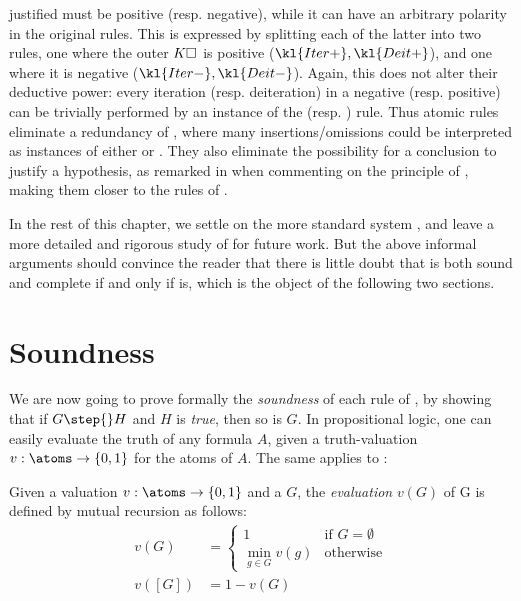 \begin{scope}
\begin{description}
  justified  must be positive (resp. negative), while it can have an
  arbitrary polarity in the original rules. This is expressed by splitting each
  of the latter into two rules, one where the outer  $K\square$ is positive
  ($\kl{Iter{+}},\kl{Deit{+}}$), and one where it is negative
  ($\kl{Iter{-}},\kl{Deit{-}}$). Again, this does not alter their deductive
  power: every iteration (resp. deiteration) in a negative (resp. positive)
   can be trivially performed by an instance of the  (resp.
  ) rule. Thus atomic rules eliminate a redundancy of ,
  where many insertions/omissions could be interpreted as instances of either
   or . They also eliminate the possibility for a
  conclusion to justify a hypothesis, as remarked in  when
  commenting on the principle of , making them closer to the
  rules of .
\end{description}

In the rest of this chapter, we settle on the more standard system ,
and leave a more detailed and rigorous study of  for future work.
But the above informal arguments should convince the reader that there is little
doubt that  is both sound and complete if and only if 
is, which is the object of the following two sections.

\section{Soundness}

We are now going to prove formally the \emph{soundness} of each rule of
, by showing that if $G \step{} H$ and $H$ is \emph{true}, then so is
$G$. In  propositional logic, one can easily evaluate the truth of any
formula $A$, given a truth-valuation $v : \atoms \to \{0,1\}$ for the atoms of
$A$. The same applies to :

\begin{definition}[Evaluation]

  Given a valuation $v : \atoms \to \{0,1\}$ and a  $G$, the
  \emph{evaluation} $v(G)$ of G is defined by mutual recursion as follows:
  \begin{align*}
    v(G) &= \begin{cases}
      1 &\text{if $G = \emptyset$} \\
      \min_{g \in G}{v(g)} &\text{otherwise}
    \end{cases} \\
    v([G]) &= 1 - v(G)
  \end{align*}
\end{definition}


\end{scope}
